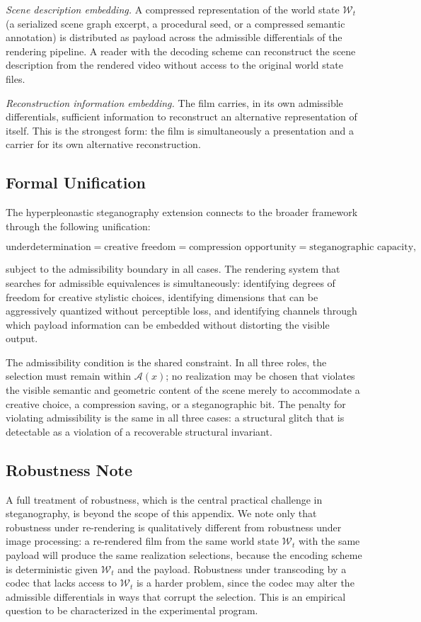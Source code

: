 \documentclass[12pt,a4paper]{article}
\theoremstyle{plain}
\theoremstyle{definition}
\theoremstyle{remark}
\begin{document}
\textit{Scene description embedding.} A compressed representation of the world state $\mathcal{W}_t$ (a serialized scene graph excerpt, a procedural seed, or a compressed semantic annotation) is distributed as payload across the admissible differentials of the rendering pipeline. A reader with the decoding scheme can reconstruct the scene description from the rendered video without access to the original world state files.

\textit{Reconstruction information embedding.} The film carries, in its own admissible differentials, sufficient information to reconstruct an alternative representation of itself. This is the strongest form: the film is simultaneously a presentation and a carrier for its own alternative reconstruction.

\subsection{Formal Unification}

The hyperpleonastic steganography extension connects to the broader framework through the following unification:

\[
\text{underdetermination} = \text{creative freedom} = \text{compression opportunity} = \text{steganographic capacity},
\]

subject to the admissibility boundary in all cases. The rendering system that searches for admissible equivalences is simultaneously: identifying degrees of freedom for creative stylistic choices, identifying dimensions that can be aggressively quantized without perceptible loss, and identifying channels through which payload information can be embedded without distorting the visible output.

The admissibility condition is the shared constraint. In all three roles, the selection must remain within $\mathcal{A}(x)$; no realization may be chosen that violates the visible semantic and geometric content of the scene merely to accommodate a creative choice, a compression saving, or a steganographic bit. The penalty for violating admissibility is the same in all three cases: a structural glitch that is detectable as a violation of a recoverable structural invariant.

\subsection{Robustness Note}

A full treatment of robustness, which is the central practical challenge in steganography, is beyond the scope of this appendix. We note only that robustness under re-rendering is qualitatively different from robustness under image processing: a re-rendered film from the same world state $\mathcal{W}_t$ with the same payload will produce the same realization selections, because the encoding scheme is deterministic given $\mathcal{W}_t$ and the payload. Robustness under transcoding by a codec that lacks access to $\mathcal{W}_t$ is a harder problem, since the codec may alter the admissible differentials in ways that corrupt the selection. This is an empirical question to be characterized in the experimental program.
\end{document}
